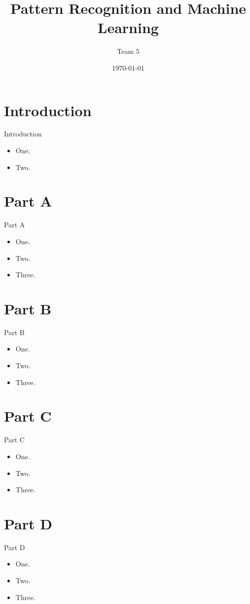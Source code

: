 \documentclass{beamer}
\title{Pattern Recognition and Machine Learning}
\author{Team 5}
\date{\today}
\begin{document}
\begin{frame}
    \titlepage
\end{frame}

\section{Introduction}
\begin{frame}{Introduction}
    \begin{itemize}
        \item One;
        \item Two.
    \end{itemize}
\end{frame}

\section{Part A}
\begin{frame}{Part A}
    \begin{itemize}
        \item One.
        \item Two.
        \item Three.
    \end{itemize}
\end{frame}

\section{Part B}
\begin{frame}{Part B}
    \begin{itemize}
        \item One.
        \item Two.
        \item Three.
    \end{itemize}
\end{frame}

\section{Part C}
\begin{frame}{Part C}
    \begin{itemize}
        \item One.
        \item Two.
        \item Three.
    \end{itemize}
\end{frame}

\section{Part D}
\begin{frame}{Part D}
    \begin{itemize}
        \item One.
        \item Two.
        \item Three.
    \end{itemize}
\end{frame}
\end{document}
